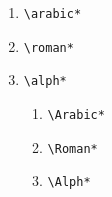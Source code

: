 \documentclass[12pt]{article}
\begin{document}
\begin{enumerate}
	\item \begin{verbatim}\arabic*\end{verbatim}
	\item \begin{verbatim}\roman*\end{verbatim}
	\item \begin{verbatim}\alph*\end{verbatim}
	\begin{enumerate}
		\item \begin{verbatim}\Arabic*\end{verbatim}
		\item \begin{verbatim}\Roman*\end{verbatim}
		\item \begin{verbatim}\Alph*\end{verbatim}
	\end{enumerate}
\end{enumerate}
\end{document}
